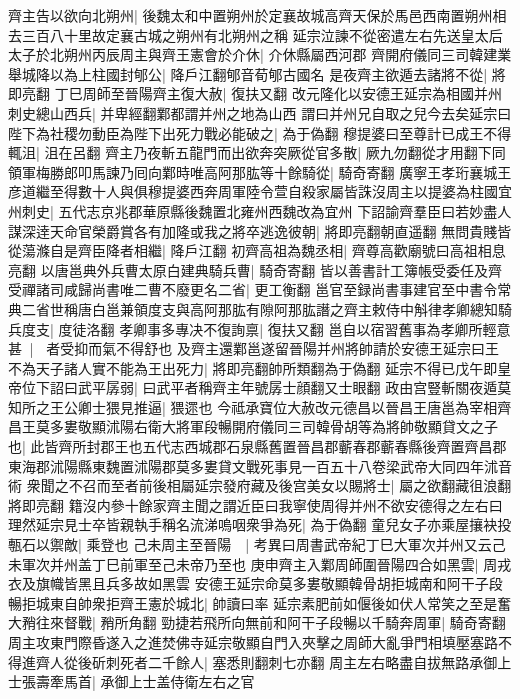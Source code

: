 齊主告以欲向北朔州|{
	後魏太和中置朔州於定襄故城高齊天保於馬邑西南置朔州相去三百八十里故定襄古城之朔州有北朔州之稱}
延宗泣諫不從密遣左右先送皇太后太子於北朔州丙辰周主與齊王憲會於介休|{
	介休縣屬西河郡}
齊開府儀同三司韓建業舉城降以為上柱國封郇公|{
	降戶江翻郇音荀郇古國名}
是夜齊主欲遁去諸將不從|{
	將即亮翻}
丁巳周師至晉陽齊主復大赦|{
	復扶又翻}
改元隆化以安德王延宗為相國并州刺史總山西兵|{
	并卑經翻鄴都謂并州之地為山西}
謂曰并州兄自取之兒今去矣延宗曰陛下為社稷勿動臣為陛下出死力戰必能破之|{
	為于偽翻}
穆提婆曰至尊計已成王不得輒沮|{
	沮在呂翻}
齊主乃夜斬五龍門而出欲奔突厥從官多散|{
	厥九勿翻從才用翻下同}
領軍梅勝郎叩馬諫乃囘向鄴時唯高阿那肱等十餘騎從|{
	騎奇寄翻}
廣寧王孝珩襄城王彦道繼至得數十人與俱穆提婆西奔周軍陸令萱自殺家屬皆誅沒周主以提婆為柱國宜州刺史|{
	五代志京兆郡華原縣後魏置北雍州西魏改為宜州}
下詔諭齊羣臣曰若妙盡人謀深逹天命官榮爵賞各有加隆或我之將卒逃逸彼朝|{
	將即亮翻朝直遥翻}
無問貴賤皆從蕩滌自是齊臣降者相繼|{
	降戶江翻}
初齊高祖為魏丞相|{
	齊尊高歡廟號曰高祖相息亮翻}
以唐邕典外兵曹太原白建典騎兵曹|{
	騎奇寄翻}
皆以善書計工簿帳受委任及齊受禪諸司咸歸尚書唯二曹不廢更名二省|{
	更工衡翻}
邕官至録尚書事建官至中書令常典二省世稱唐白邕兼領度支與高阿那肱有隙阿那肱譖之齊主敕侍中斛律孝卿總知騎兵度支|{
	度徒洛翻}
孝卿事多專决不復詢禀|{
	復扶又翻}
邕自以宿習舊事為孝卿所輕意甚|{
	者受抑而氣不得舒也}
及齊主還鄴邕遂留晉陽并州將帥請於安德王延宗曰王不為天子諸人實不能為王出死力|{
	將即亮翻帥所類翻為于偽翻}
延宗不得已戊午即皇帝位下詔曰武平孱弱|{
	曰武平者稱齊主年號孱士顔翻又士眼翻}
政由宫豎斬關夜遁莫知所之王公卿士猥見推逼|{
	猥遝也}
今祗承寶位大赦改元德昌以晉昌王唐邕為宰相齊昌王莫多婁敬顯沭陽右衛大將軍段暢開府儀同三司韓骨胡等為將帥敬顯貸文之子也|{
	此皆齊所封郡王也五代志西城郡石泉縣舊置晉昌郡蘄春郡蘄春縣後齊置齊昌郡東海郡沭陽縣東魏置沭陽郡莫多婁貸文戰死事見一百五十八卷梁武帝大同四年沭音術}
衆聞之不召而至者前後相屬延宗發府藏及後宫美女以賜將士|{
	屬之欲翻藏徂浪翻將即亮翻}
籍沒内參十餘家齊主聞之謂近臣曰我寧使周得并州不欲安德得之左右曰理然延宗見士卒皆親執手稱名流涕嗚咽衆爭為死|{
	為于偽翻}
童兒女子亦乘屋攘袂投甎石以禦敵|{
	乘登也}
己未周主至晉陽　|{
	考異曰周書武帝紀丁巳大軍次并州又云己未軍次并州盖丁巳前軍至己未帝乃至也}
庚申齊主入鄴周師圍晉陽四合如黑雲|{
	周戎衣及旗幟皆黑且兵多故如黑雲}
安德王延宗命莫多婁敬顯韓骨胡拒城南和阿干子段暢拒城東自帥衆拒齊王憲於城北|{
	帥讀曰率}
延宗素肥前如偃後如伏人常笑之至是奮大矟往來督戰|{
	矟所角翻}
勁捷若飛所向無前和阿干子段暢以千騎奔周軍|{
	騎奇寄翻}
周主攻東門際昏遂入之進焚佛寺延宗敬顯自門入夾擊之周師大亂爭門相填壓塞路不得進齊人從後斫刺死者二千餘人|{
	塞悉則翻刺七亦翻}
周主左右略盡自拔無路承御上士張壽牽馬首|{
	承御上士盖侍衛左右之官}
